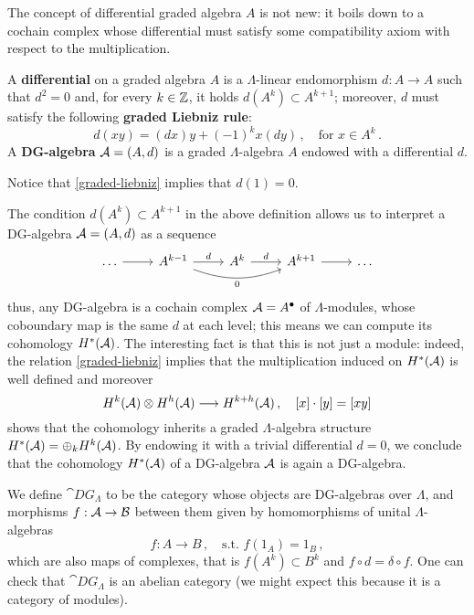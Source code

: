 	The concept of differential graded algebra $A$ is not new:
	it boils down to a cochain complex whose differential
	must satisfy some compatibility axiom with respect to the multiplication.
	
	\begin{df}
		A \textbf{differential} on a graded algebra $A$ is a
		$\Lambda$-linear endomorphism $d:A \to A$
		such that $d^{2} = 0$ and, for every $k \in {\mathbb Z}$,
		it holds $d(A^{k}) \subset A^{k+1}$;
		moreover, $d$ must satisfy the following \textbf{graded Liebniz rule}:
		\begin{equation}\label{graded-liebniz}
		 	d(xy) = (dx)y + (-1)^{k}x (dy)\,,
		 	\quad \text{for } x \in A^{k}\,.
		 \end{equation} 
		A \textbf{DG-algebra} $\mathcal{A} = (A,d)$
		is a graded $\Lambda$-algebra $A$ endowed with a differential $d$.
	\end{df}
	
	\begin{rmk}
		Notice that \eqref{graded-liebniz} implies that $d(1)=0$.
	\end{rmk}	
	
	The condition $d(A^{k}) \subset A^{k+1}$ in the above definition
	allows us to interpret a DG-algebra $\mathcal{A} = (A,d)$ as a
	sequence
	\begin{equation*}
		\begin{tikzcd}
			\dots \ar[r] & A^{k-1} \ar[r, "d"] \ar[rr, bend right=20, "0"']
			& A^{k} \ar[r, "d"] 
			& A^{k+1} \ar[r] & \dots
		\end{tikzcd}
	\end{equation*}
	thus, any DG-algebra is a cochain complex $\mathcal{A} = A^{\bullet}$
	of $\Lambda$-modules,
	whose coboundary map is the same $d$ at each level;
	this means we can compute its cohomology
	$H^{*}(\mathcal{A})$. The interesting fact is that 
	this is not just a module:
	indeed, the relation \eqref{graded-liebniz} implies that
	the multiplication induced on $H^{*}(\mathcal{A})$ 
	is well defined and moreover
	\begin{equation*}
		H^{k}(\mathcal{A}) \otimes H^{h}(\mathcal{A}) \longrightarrow H^{k+h}(\mathcal{A})\,,
		\quad [x] \cdot [y] = [xy]
	\end{equation*}
	shows that the cohomology inherits a graded $\Lambda$-algebra 
	structure $H^{*}(\mathcal{A}) = \oplus_{k} H^{k}(\mathcal{A})$.
	By endowing it with a trivial differential $d=0$,
	we conclude that the cohomology $H^{*}(\mathcal{A})$ of a DG-algebra $\mathcal{A}$
	is again a DG-algebra.
	
	
	We define $\cat{DG}_{\Lambda}$ to be the category whose objects
	are DG-algebras over $\Lambda$, 
	and morphisms $f:\mathcal{A} \to \mathcal{B}$ between them
	given by homomorphisms of unital $\Lambda$-algebras
	\begin{equation*}
		f : A \longrightarrow B\,, \quad 
		\text{s.t. } f\left(1_{A}\right) = 1_{B}\,,
	\end{equation*}
	which are also maps of complexes, that is 
	$f(A^{k}) \subset B^{k}$ and $f \circ d = \delta \circ f$.
	One can check that $\cat{DG}_{\Lambda}$ is an abelian category
	(we might expect this because it is a category of modules).
	
